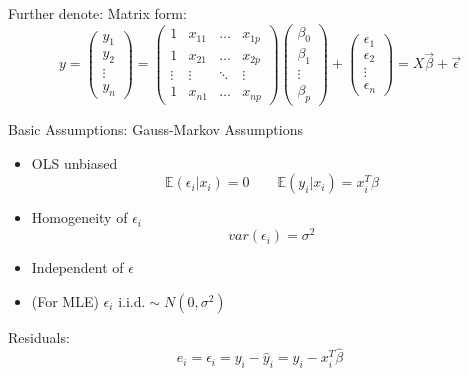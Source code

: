     Further denote: Matrix form:
    \begin{equation}\label{EqaMatrixRepreOfSSE}
        y=\begin{pmatrix}
            y_1\\
            y_2\\
            \vdots\\
            y_n
        \end{pmatrix}  
        =
        \begin{pmatrix}
            1&x_{11}&\ldots&x_{1p}\\
            1&x_{21}&\ldots&x_{2p}\\
            \vdots&\vdots&\ddots&\vdots\\
            1&x_{n1}&\ldots&x_{np}
        \end{pmatrix}
        \begin{pmatrix}
            \beta_0\\
            \beta_1\\
            \vdots\\
            \beta_p
        \end{pmatrix}
        +
        \begin{pmatrix}
            \epsilon_1\\
            \epsilon_2\\
            \vdots\\
            \epsilon_n
        \end{pmatrix}
        =X\vec{\beta}+\vec{\epsilon}
    \end{equation}

    Basic Assumptions: Gauss-Markov Assumptions
    \begin{itemize}
        \item OLS unbiased\begin{equation}\mathbb{E}(\epsilon_i|x_i)=0\qquad \mathbb{E}(y_i|x_i)=x_i^T\beta\end{equation}
        \item Homogeneity of $\epsilon_i$\begin{equation}var(\epsilon_i)=\sigma^2\end{equation}
        \item Independent of $\epsilon$
        \item (For MLE) $\epsilon_i\text{ i.i.d.}\sim N(0,\sigma^2)$
    \end{itemize}

    Residuals:
    \begin{equation}e_i=\hat{\epsilon}_i=y_i-\hat{y}_i=y_i-x_i^T\hat{\beta }\end{equation}

